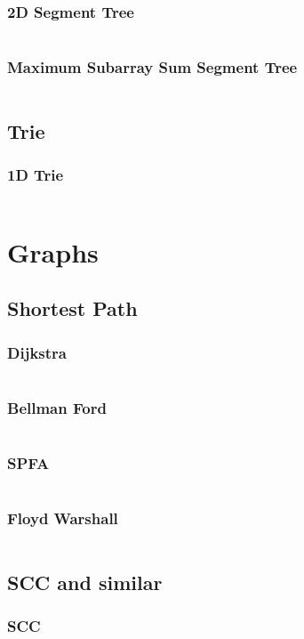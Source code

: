 \documentclass[a4paper,landscape,9pt,twocolumn]{article}
\begin{document}
\subsubsection{2D Segment Tree}
\inputminted{python}{codes/ds/2dseg.py}
\subsubsection{Maximum Subarray Sum Segment Tree}
\inputminted{python}{codes/ds/mineseg.py}
\subsection{Trie}
\subsubsection{1D Trie}
\inputminted{python}{codes/ds/trie.py}

\section{Graphs}
\subsection{Shortest Path}
\subsubsection{Dijkstra}
\inputminted{python}{codes/graphs/dijkstra.py}
\subsubsection{Bellman Ford}
\inputminted{python}{codes/graphs/bellman_ford.py}
\subsubsection{SPFA}
\inputminted{python}{codes/graphs/spfa.py}
\subsubsection{Floyd Warshall}
\inputminted{python}{codes/graphs/floyd.py}
\subsection{SCC and similar}
\subsubsection{SCC}
\inputminted{python}{codes/graphs/scc.py}
\end{document}
